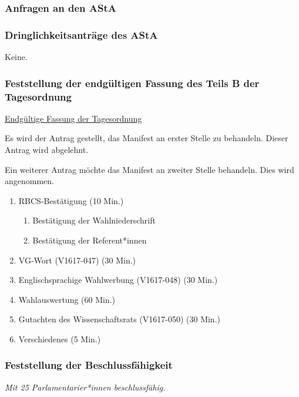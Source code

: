 \documentclass[ngerman,headheight=70pt]{scrartcl}
\begin{document}
    \subsubsection{Anfragen an den AStA}



    \subsubsection{Dringlichkeitsanträge des AStA}

    Keine.

    \newpage
    \subsubsection{Feststellung der endgültigen Fassung des Teils B der Tagesordnung}

    \underline{Endgültige Fassung der Tagesordnung}

    Es wird der Antrag gestellt, das Manifest an erster Stelle zu behandeln.
    Dieser Antrag wird abgelehnt.

    Ein weiterer Antrag möchte das Manifest an zweiter Stelle behandeln. Dies
    wird angenommen.
    \begin{enumerate}[label={\textbf{Top \theenumi}},leftmargin=*]
        \item RBCS-Bestätigung (10 Min.)
        \begin{enumerate}
            \item Bestätigung der Wahlniederschrift
            \item Bestätigung der Referent*innen
        \end{enumerate}
        \item VG-Wort (V1617-047) (30 Min.)
        \item Englischsprachige Wahlwerbung (V1617-048) (30 Min.)
        \item Wahlauswertung (60 Min.)
        \item Gutachten des Wissenschaftsrats (V1617-050) (30 Min.)
        \item Verschiedenes (5 Min.)
    \end{enumerate}

    \subsubsection{Feststellung der Beschlussfähigkeit}

    \textit{Mit 25 Parlamentarier*innen beschlussfähig.}
\end{document}
